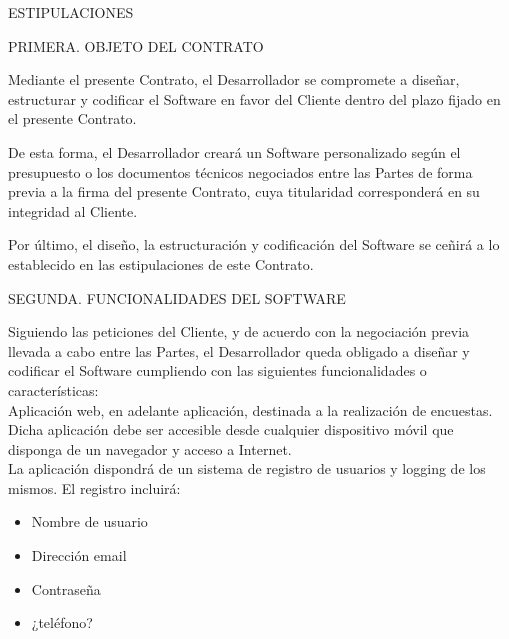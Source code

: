 \documentclass[a4paper,11pt]{report}
\begin{document}
	ESTIPULACIONES
	
	PRIMERA. OBJETO DEL CONTRATO
	
	Mediante el presente Contrato, el Desarrollador se compromete a diseñar,
	estructurar y codificar el Software en favor del Cliente dentro del
	plazo fijado en el presente Contrato.
	
	De esta forma, el Desarrollador creará un Software personalizado según
	el presupuesto o los documentos técnicos negociados entre las Partes de
	forma previa a la firma del presente Contrato, cuya titularidad
	corresponderá en su integridad al Cliente.
	
	Por último, el diseño, la estructuración y codificación del Software se
	ceñirá a lo establecido en las estipulaciones de este Contrato.
	
	SEGUNDA. FUNCIONALIDADES DEL SOFTWARE
	
	Siguiendo las peticiones del Cliente, y de acuerdo con la negociación
	previa llevada a cabo entre las Partes, el Desarrollador queda obligado
	a diseñar y codificar el Software cumpliendo con las siguientes
	funcionalidades o características:
	\\
	Aplicación web, en adelante aplicación, destinada a la realización de encuestas. Dicha aplicación debe ser accesible desde cualquier dispositivo móvil que disponga de un navegador y acceso a Internet.
	\\
	La aplicación dispondrá de un sistema de registro de usuarios y logging de los mismos. El registro incluirá:
	\begin{itemize}
		\item Nombre de usuario
		\item Dirección email
		\item Contraseña
		\item ¿teléfono?
	\end{itemize}
\end{document}
